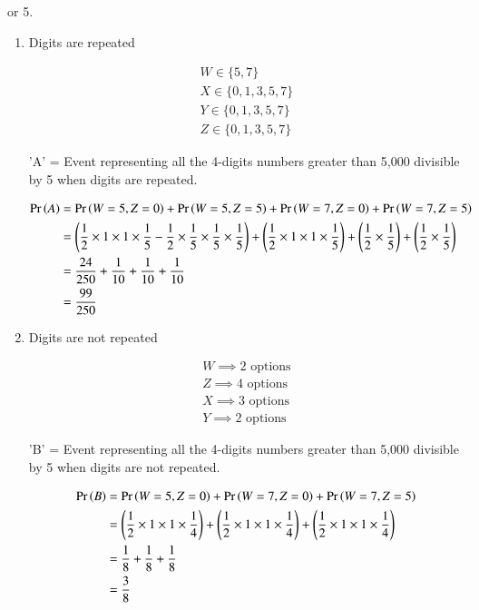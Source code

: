 \documentclass[journal,12pt,onecolumn]{IEEEtran}
\begin{document}
 or 5.

\begin{enumerate}
\item Digits are repeated

 \begin{align}
     W \in \{5,7\} \\
     X \in \{0,1,3,5,7\} \\
     Y \in \{0,1,3,5,7\} \\
     Z \in \{0,1,3,5,7\}
 \end{align}

'A' = Event representing all the 4-digits numbers greater than 5,000 divisible by 5 when digits are repeated.

\begin{align}
\Pr\left(A\right) &= \Pr\left(W=5,Z=0\right) + \Pr\left(W=5,Z=5\right) + \Pr\left(W=7,Z=0\right) + \Pr\left(W=7,Z=5\right) \\
 &= \left(\frac{1}{2}\times1\times1\times\frac{1}{5} - \frac{1}{2}\times\frac{1}{5}\times\frac{1}{5}\times\frac{1}{5} \right) + \left(\frac{1}{2}\times1\times1\times\frac{1}{5}\right) +\left(\frac{1}{2}\times\frac{1}{5} \right) + \left(\frac{1}{2}\times\frac{1}{5} \right) \\
 &=\frac{24}{250} + \frac{1}{10} + \frac{1}{10} + \frac{1}{10}\\
&= \frac{99}{250}
 \end{align}

\item Digits are not repeated 

 \begin{align}
     W \implies \text{2 options} \\
     Z \implies \text{4 options} \\
     X \implies \text{3 options} \\
     Y \implies \text{2 options}
 \end{align}

'B' = Event representing all the 4-digits numbers greater than 5,000 divisible by 5 when digits are not repeated.

\begin{align}
\Pr\left(B\right) &= \Pr\left(W=5,Z=0\right) + \Pr\left(W=7,Z=0\right) + \Pr\left(W=7,Z=5\right) \\
&= \left(\frac{1}{2}\times1\times1\times\frac{1}{4} \right)+ \left(\frac{1}{2}\times1\times1\times\frac{1}{4}\right) + \left(\frac{1}{2}\times1\times1\times\frac{1}{4}\right)\\
&= \frac{1}{8} + \frac{1}{8} + \frac{1}{8} \\
&= \frac{3}{8}
\end{align}
\end{enumerate}
\end{document}
